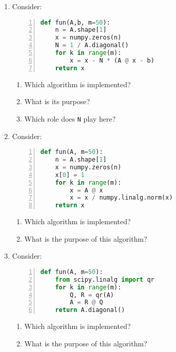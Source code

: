 \vspace*{-0.5cm}
\begin{enumerate}
	\item Consider:
\begin{lstlisting}[language=python,numbers=left]
def fun(A,b, m=50):
    n = A.shape[1]
    x = numpy.zeros(n)
    N = 1 / A.diagonal()		
    for k in range(m):
        x = x - N * (A @ x - b)
    return x
\end{lstlisting}
	\begin{enumerate}
		\item Which algorithm is implemented?
		\item What is its purpose? 
		\item Which role does \verb|N| play here?
	\end{enumerate}
\item Consider:
\begin{lstlisting}[language=python,numbers=left]
def fun(A, m=50):
    n = A.shape[1]
    x = numpy.zeros(n)
    x[0] = 1	
    for k in range(m):
        x = A @ x
        x = x / numpy.linalg.norm(x)
    return x
\end{lstlisting}
\begin{enumerate}
	\item Which algorithm is implemented? 
	\item What is the purpose of this algorithm?
\end{enumerate}
\item Consider:
\begin{lstlisting}[language=python,numbers=left]
def fun(A, m=50):
    from scipy.linalg import qr
    for k in range(m):
        Q, R = qr(A)
        A = R @ Q
    return A.diagonal()
\end{lstlisting}
\begin{enumerate}
	\item Which algorithm is implemented? 
	\item What is the purpose of this algorithm?
\end{enumerate}
\end{enumerate}
 